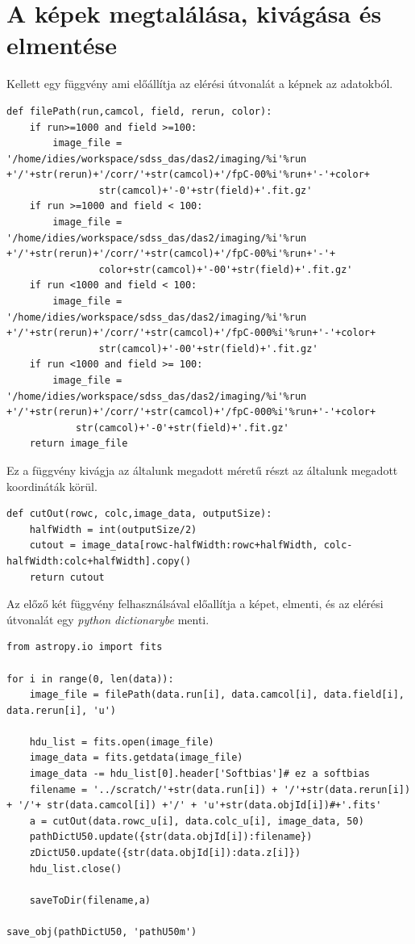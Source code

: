 \documentclass[12pt,letterpaper,oneside,openright]{book}
\begin{document}
\section{A képek megtalálása, kivágása és elmentése}
\label{code}
Kellett egy függvény ami előállítja az elérési útvonalát a képnek az adatokból.
\begin{lstlisting}
def filePath(run,camcol, field, rerun, color):
    if run>=1000 and field >=100:
        image_file = '/home/idies/workspace/sdss_das/das2/imaging/%i'%run +'/'+str(rerun)+'/corr/'+str(camcol)+'/fpC-00%i'%run+'-'+color+
        		str(camcol)+'-0'+str(field)+'.fit.gz'
    if run >=1000 and field < 100:
        image_file = '/home/idies/workspace/sdss_das/das2/imaging/%i'%run +'/'+str(rerun)+'/corr/'+str(camcol)+'/fpC-00%i'%run+'-'+
        		color+str(camcol)+'-00'+str(field)+'.fit.gz'
    if run <1000 and field < 100:
        image_file = '/home/idies/workspace/sdss_das/das2/imaging/%i'%run +'/'+str(rerun)+'/corr/'+str(camcol)+'/fpC-000%i'%run+'-'+color+
        		str(camcol)+'-00'+str(field)+'.fit.gz'
    if run <1000 and field >= 100:
        image_file = '/home/idies/workspace/sdss_das/das2/imaging/%i'%run +'/'+str(rerun)+'/corr/'+str(camcol)+'/fpC-000%i'%run+'-'+color+
        	str(camcol)+'-0'+str(field)+'.fit.gz'
    return image_file
\end{lstlisting}
Ez a függvény kivágja az általunk megadott méretű részt az általunk megadott koordináták körül.
\begin{lstlisting}
def cutOut(rowc, colc,image_data, outputSize):
    halfWidth = int(outputSize/2)
    cutout = image_data[rowc-halfWidth:rowc+halfWidth, colc-halfWidth:colc+halfWidth].copy()
    return cutout
\end{lstlisting}
Az előző két függvény felhasználsával előallítja a képet, elmenti, és az elérési útvonalát egy \textit{python dictionarybe} menti.
\begin{lstlisting}
from astropy.io import fits

for i in range(0, len(data)):
    image_file = filePath(data.run[i], data.camcol[i], data.field[i], data.rerun[i], 'u')

    hdu_list = fits.open(image_file)
    image_data = fits.getdata(image_file)
    image_data -= hdu_list[0].header['Softbias']# ez a softbias
    filename = '../scratch/'+str(data.run[i]) + '/'+str(data.rerun[i]) + '/'+ str(data.camcol[i]) +'/' + 'u'+str(data.objId[i])#+'.fits'
    a = cutOut(data.rowc_u[i], data.colc_u[i], image_data, 50)
    pathDictU50.update({str(data.objId[i]):filename})
    zDictU50.update({str(data.objId[i]):data.z[i]})
    hdu_list.close()
    
    saveToDir(filename,a)
    
save_obj(pathDictU50, 'pathU50m')
\end{lstlisting}
\end{document}
